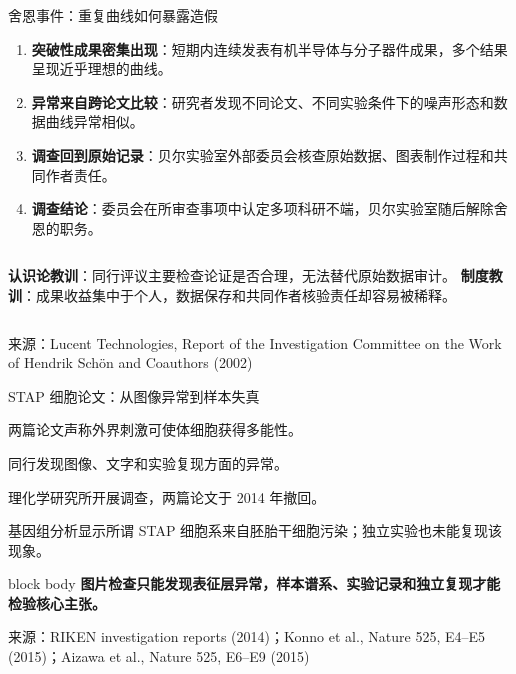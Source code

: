 \documentclass[aspectratio=169,10pt]{ctexbeamer}
\newcommand{\key}[1]{\textcolor{DeepBlue}{\textbf{#1}}}
\newcommand{\warn}[1]{\textcolor{WarmRed}{\textbf{#1}}}
\newcommand{\source}[1]{%
  \par\vfill\begingroup\color{Muted}\fontsize{5.8}{7}\selectfont 来源：#1\endgroup
}
\newcommand{\takeaway}[1]{%
  \begin{beamercolorbox}[rounded=true,sep=0.65em,wd=\linewidth]{block body}
    \centering\color{MutedBlue}\textbf{#1}
  \end{beamercolorbox}
}
\begin{document}
\begin{frame}{舍恩事件：重复曲线如何暴露造假}
  \begin{enumerate}
    \item \key{突破性成果密集出现}：短期内连续发表有机半导体与分子器件成果，多个结果呈现近乎理想的曲线。
    \item \key{异常来自跨论文比较}：研究者发现不同论文、不同实验条件下的噪声形态和数据曲线异常相似。
    \item \key{调查回到原始记录}：贝尔实验室外部委员会核查原始数据、图表制作过程和共同作者责任。
    \item \key{调查结论}：委员会在所审查事项中认定多项科研不端，贝尔实验室随后解除舍恩的职务。
  \end{enumerate}

  \vspace{0.30cm}
  \begin{columns}[T,onlytextwidth]
      \warn{认识论教训}：同行评议主要检查论证是否合理，无法替代原始数据审计。
      \warn{制度教训}：成果收益集中于个人，数据保存和共同作者核验责任却容易被稀释。
  \end{columns}
  \source{Lucent Technologies, Report of the Investigation Committee on the Work of Hendrik Schön and Coauthors (2002)}
\end{frame}

\begin{frame}{STAP 细胞论文：从图像异常到样本失真}
  \begin{description}[后续验证]
    \item[2014 年 1 月] 两篇论文声称外界刺激可使体细胞获得多能性。
    \item[质疑出现] 同行发现图像、文字和实验复现方面的异常。
    \item[调查撤稿] 理化学研究所开展调查，两篇论文于 2014 年撤回。
    \item[后续验证] 基因组分析显示所谓 STAP 细胞系来自胚胎干细胞污染；独立实验也未能复现该现象。
  \end{description}

  \vspace{0.35cm}
  \takeaway{图片检查只能发现表征层异常，样本谱系、实验记录和独立复现才能检验核心主张。}
  \source{RIKEN investigation reports (2014)；Konno et al., Nature 525, E4--E5 (2015)；Aizawa et al., Nature 525, E6--E9 (2015)}
\end{frame}
\end{document}
